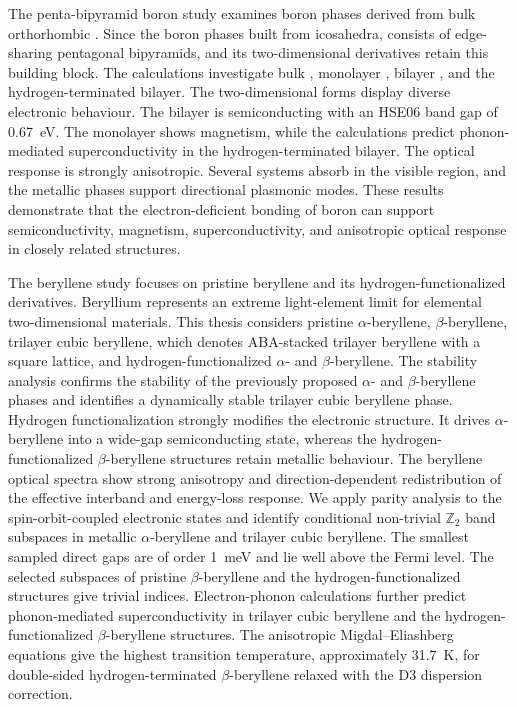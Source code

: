The penta-bipyramid boron study examines boron phases derived from bulk orthorhombic .
Since the boron phases built from  icosahedra, 
 consists of edge-sharing  pentagonal bipyramids, and its two-dimensional derivatives retain this building block.
The calculations investigate bulk , monolayer , bilayer , and the hydrogen-terminated bilayer.
The two-dimensional forms display diverse electronic behaviour.
The bilayer is semiconducting with an HSE06 band gap of \qty{0.67}{\electronvolt}.
The monolayer shows magnetism, while the calculations predict phonon-mediated superconductivity in the hydrogen-terminated bilayer.
The optical response is strongly anisotropic.
Several systems absorb in the visible region, and the metallic phases support directional plasmonic modes.
These results demonstrate that the electron-deficient bonding of boron can support semiconductivity, magnetism, superconductivity, and anisotropic optical response in closely related structures.

The beryllene study focuses on pristine beryllene and its hydrogen-functionalized derivatives.
Beryllium represents an extreme light-element limit for elemental two-dimensional materials.
This thesis considers pristine $\alpha$-beryllene, $\beta$-beryllene, trilayer cubic beryllene, which denotes ABA-stacked trilayer beryllene with a square lattice, and hydrogen-functionalized $\alpha$- and $\beta$-beryllene.
The stability analysis confirms the stability of the previously proposed $\alpha$- and $\beta$-beryllene phases and identifies a dynamically stable trilayer cubic beryllene phase.
Hydrogen functionalization strongly modifies the electronic structure.
It drives $\alpha$-beryllene into a wide-gap semiconducting state, whereas the hydrogen-functionalized $\beta$-beryllene structures retain metallic behaviour.
The beryllene optical spectra show strong anisotropy and direction-dependent redistribution of the effective interband and energy-loss response.
We apply parity analysis to the spin-orbit-coupled electronic states and identify conditional non-trivial $\mathbb{Z}_2$ band subspaces in metallic $\alpha$-beryllene and trilayer cubic beryllene.
The smallest sampled direct gaps are of order \qty{1}{\milli\electronvolt} and lie well above the Fermi level.
The selected subspaces of pristine $\beta$-beryllene and the hydrogen-functionalized structures give trivial indices.
Electron-phonon calculations further predict phonon-mediated superconductivity in trilayer cubic beryllene and the hydrogen-functionalized $\beta$-beryllene structures.
The anisotropic Migdal--Eliashberg equations give the highest transition temperature, approximately \qty{31.7}{\kelvin}, for double-sided hydrogen-terminated $\beta$-beryllene relaxed with the D3 dispersion correction.


